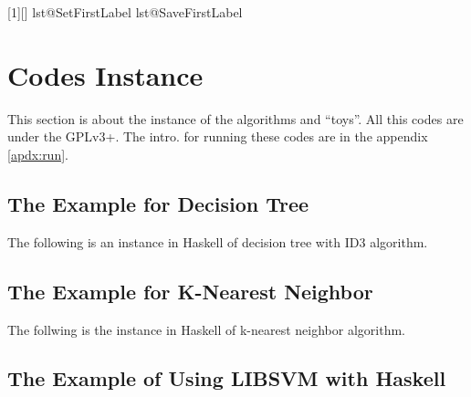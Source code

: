 \documentclass{article}
\begin{document}
\begin{appendix}
	\setcounter{codeline}{1}
	\setcounter{lstnumber}{1}
	[]
	{ \setcounter{lstnumber}{\value{codeline}}
		\csname lst@SetFirstLabel\endcsname}
	{ \csname lst@SaveFirstLabel\endcsname
		\setcounter{codeline}{\value{lstnumber}}
	}
	
	\section{Codes Instance}
	\label{apdx:codes}
	
	This section is about the instance of the algorithms and ``toys''.
	All this codes are under the  GPLv3+.
	The intro. for running these codes are in the appendix \ref{apdx:run}.	
	
	\subsection{The Example for Decision Tree}
	\label{code:dc}
	
	The following is an instance in Haskell of decision tree with ID3 algorithm.
	
	
	
	\subsection{The Example for  K-Nearest Neighbor}
	\label{code:knn}
	
	The follwing is the instance in Haskell of k-nearest neighbor algorithm.
	
	
	\subsection{The Example of Using LIBSVM with Haskell}
	\label{code:svm}
	

\end{appendix}
\end{document}
